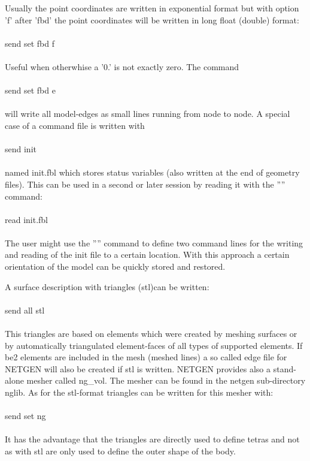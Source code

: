 \documentclass{article}
\begin{document}
Usually the point coordinates are written in exponential format but with option 'f' after 'fbd' the point coordinates will be written in long float (double) format:\\\\send set fbd f\\\\Useful when otherwhise a '0.' is not exactly zero. The command \\\\send set fbd e\\\\will write all model-edges as small lines running from node to node. A special case of a command file is written with\\\\send init\\\\named init.fbl which stores status variables (also written at the end of geometry files). This can be used in a second or later session by reading it with the '''' command:\\\\read init.fbl\\\\The user might use the '''' command to define two command lines for the writing and reading of the init file to a certain location. With this approach a certain orientation of the model can be quickly stored and restored.

A surface description with triangles (stl)can be written:\\\\send all stl\\\\This triangles are based on elements which were created by meshing surfaces or by automatically triangulated element-faces of all types of supported elements. If be2 elements are included in the mesh (meshed lines) a so called edge file for NETGEN will also be created if stl is written. NETGEN provides also a stand-alone mesher called ng\_vol. The mesher can be found in the netgen sub-directory nglib. As for the stl-format triangles can be written for this mesher with:\\\\send set ng\\\\It has the advantage that the triangles are directly used to define tetras and not as with stl are only used to define the outer shape of the body.
\end{document}
